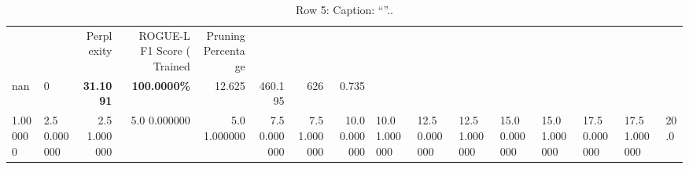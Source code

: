\begin{table}
\caption{Row 5\ifshowcaption{}: Caption: ``''.\else.\fi}
\label{tab:evaluation-pipeline-5}
\begin{tabular}{llrrrrrr}
 &  & Perplexity & ROGUE-L F1 Score (%
Trained & Pruning Percentage &  &  &  &  &  &  \\
nan & 0 & \bfseries 31.1091 & \bfseries 100.0000\% & 12.625 & 460.195 & 626 & 0.735 \\
1.000000 & 2.5%
0.000000 & 2.5%
1.000000 & 5.0%
0.000000 & 5.0%
1.000000 & 7.5%
0.000000 & 7.5%
1.000000 & 10.0%
0.000000 & 10.0%
1.000000 & 12.5%
0.000000 & 12.5%
1.000000 & 15.0%
0.000000 & 15.0%
1.000000 & 17.5%
0.000000 & 17.5%
1.000000 & 20.0%

\end{tabular}
\end{table}
